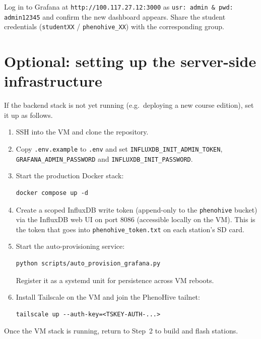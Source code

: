 Log in to Grafana at \texttt{http://100.117.27.12:3000} as \texttt{usr: admin \& pwd: admin12345} and confirm the new dashboard appears. Share the student credentials (\texttt{studentXX} / \texttt{phenohive\_XX}) with the corresponding group.

\section{Optional: setting up the server-side infrastructure}

If the backend stack is not yet running (e.g.\ deploying a new course edition), set it up as follows.

\begin{enumerate}
    \item SSH into the VM and clone the repository.
    \item Copy \texttt{.env.example} to \texttt{.env} and set \texttt{INFLUXDB\_INIT\_ADMIN\_TOKEN}, \texttt{GRAFANA\_ADMIN\_PASSWORD} and \texttt{INFLUXDB\_INIT\_PASSWORD}.
    \item Start the production Docker stack:
    \begin{verbatim}
docker compose up -d
    \end{verbatim}
    \item Create a scoped InfluxDB write token (append-only to the \texttt{phenohive} bucket) via the InfluxDB web UI on port 8086 (accessible locally on the VM). This is the token that goes into \texttt{phenohive\_token.txt} on each station's SD card.
    \item Start the auto-provisioning service:
    \begin{verbatim}
python scripts/auto_provision_grafana.py
    \end{verbatim}
    Register it as a systemd unit for persistence across VM reboots.
    \item Install Tailscale on the VM and join the PhenoHive tailnet:
    \begin{verbatim}
tailscale up --auth-key=<TSKEY-AUTH-...>
    \end{verbatim}
\end{enumerate}

Once the VM stack is running, return to Step~2 to build and flash stations.
